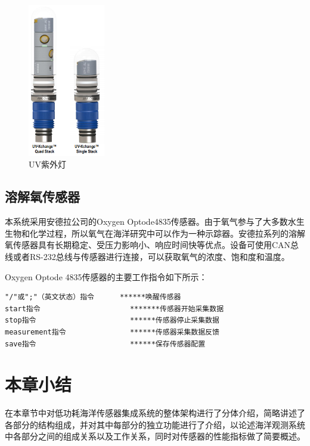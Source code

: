 \begin{figure}[ht]
    \centering
	\includegraphics[width=0.3\textwidth]{fig/UV灯.png}
	\caption{UV紫外灯}
	\label{fig:UV}
\end{figure}

\subsection{溶解氧传感器}
本系统采用安德拉公司的Oxygen Optode4835传感器。由于氧气参与了大多数水生生物和化学过程，所以氧气在海洋研究中可以作为一种示踪器。安德拉系列的溶解氧传感器具有长期稳定、受压力影响小、响应时间快等优点。设备可使用CAN总线或者RS-232总线与传感器进行连接，可以获取氧气的浓度、饱和度和温度。

Oxygen Optode 4835传感器的主要工作指令如下所示：
\begin{lstlisting}
"/"或";"（英文状态）指令      ******唤醒传感器
start指令                     *******传感器开始采集数据
stop指令                      ******传感器停止采集数据
measurement指令               ******传感器采集数据反馈
save指令                      ******保存传感器配置
\end{lstlisting}

\section{本章小结}
在本章节中对低功耗海洋传感器集成系统的整体架构进行了分体介绍，简略讲述了各部分的结构组成，并对其中每部分的独立功能进行了介绍，以论述海洋观测系统中各部分之间的组成关系以及工作关系，同时对传感器的性能指标做了简要概述。
